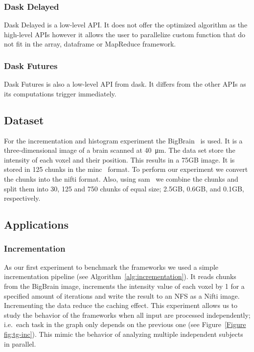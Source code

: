 \documentclass[conference]{IEEEtran}
\begin{document}
\subsubsection{Dask Delayed~\cite{dask-delayed}} Dask Delayed is a low-level API. It
does not offer the optimized algorithm as the high-level APIs however it allows the
user to parallelize custom function that do not fit in the array, dataframe or
MapReduce framework.

\subsubsection{Dask Futures~\cite{dask-futures}} Dask Futures is also a low-level API
from dask. It differs from the other APIs as its computations trigger immediately.

\subsection{Dataset}
For the incrementation and histogram experiment the BigBrain~\cite{Amunts:13} is
used. It is a three-dimensional image of a brain scanned at \SI{40}{\micro\metre}.
The data set store the intensity of each voxel and their position. This results in a
75GB image. It is stored in 125 chunks in the minc~\cite{minc} format. To perform our
experiment we convert the chunks into the nifti format. Also, using sam~\cite{sam} we
combine the chunks and split them into 30, 125 and 750 chunks of equal size; 2.5GB,
0.6GB, and 0.1GB, respectively.

\subsection{Applications}

\subsubsection{\textbf{Incrementation}}
As our first experiment to benchmark the frameworks we used a simple incrementation
pipeline (see Algorithm~\ref{alg:incrementation}). It reads chunks from the BigBrain
image, increments the intensity value of each voxel by 1 for a specified amount of
iterations and write the result to an NFS as a Nifti image. Incrementing the data
reduce the caching effect. This experiment allows us to study the behavior of the
frameworks when all input are processed independently; i.e.\ each task in the graph
only depends on the previous one (see Figure~\ref{Figure fig:tg-inc}). This mimic the
behavior of analyzing multiple independent subjects in parallel.
\end{document}
